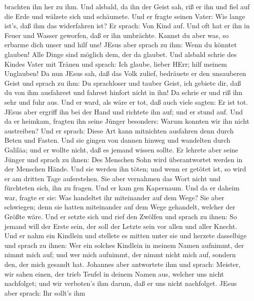 brachten ihn her zu ihm. Und alsbald, da ihn der Geist sah, riß er ihn
und fiel auf die Erde und wälzete sich und schäumete.  Und
er fragte seinen Vater: Wie lange ist's, daß ihm das widerfahren ist? Er
sprach: Von Kind auf.  Und oft hat er ihn in Feuer und
Wasser geworfen, daß er ihn umbrächte. Kannst du aber was, so erbarme
dich unser und hilf uns!  JEsus aber sprach zu ihm: Wenn du
könntet glauben! Alle Dinge sind möglich dem, der da glaubet.
 Und alsbald schrie des Kindes Vater mit Tränen und sprach:
Ich glaube, lieber HErr; hilf meinem Unglauben!  Da nun
JEsus sah, daß das Volk zulief, bedräuete er den unsauberen Geist und
sprach zu ihm: Du sprachloser und tauber Geist, ich gebiete dir, daß du
von ihm ausfahrest und fahrest hinfort nicht in ihn!  Da
schrie er und riß ihn sehr und fuhr aus. Und er ward, als wäre er tot,
daß auch viele sagten: Er ist tot.  JEsus aber ergriff ihn
bei der Hand und richtete ihn auf; und er stund auf.  Und
da er heimkam, fragten ihn seine Jünger besonders: Warum konnten wir ihn
nicht austreiben?  Und er sprach: Diese Art kann mitnichten
ausfahren denn durch Beten und Fasten.  Und sie gingen von
dannen hinweg und wandelten durch Galiläa; und er wollte nicht, daß es
jemand wissen sollte.  Er lehrete aber seine Jünger und
sprach zu ihnen: Des Menschen Sohn wird überantwortet werden in der
Menschen Hände. Und sie werden ihn töten; und wenn er getötet ist, so
wird er am dritten Tage auferstehen.  Sie aber vernahmen
das Wort nicht und fürchteten sich, ihn zu fragen.  Und er
kam gen Kapernaum. Und da er daheim war, fragte er sie: Was handeltet
ihr miteinander auf dem Wege?  Sie aber schwiegen; denn sie
hatten miteinander auf dem Wege gehandelt, welcher der Größte wäre.
 Und er setzte sich und rief den Zwölfen und sprach zu
ihnen: So jemand will der Erste sein, der soll der Letzte sein vor allen
und aller Knecht.  Und er nahm ein Kindlein und stellete es
mitten unter sie und herzete dasselbige und sprach zu ihnen:
 Wer ein solches Kindlein in meinem Namen aufnimmt, der
nimmt mich auf; und wer mich aufnimmt, der nimmt nicht mich auf, sondern
den, der mich gesandt hat.  Johannes aber antwortete ihm
und sprach: Meister, wir sahen einen, der trieb Teufel in deinem Namen
aus, welcher uns nicht nachfolget; und wir verboten's ihm darum, daß er
uns nicht nachfolget.  JEsus aber sprach: Ihr sollt's ihm
